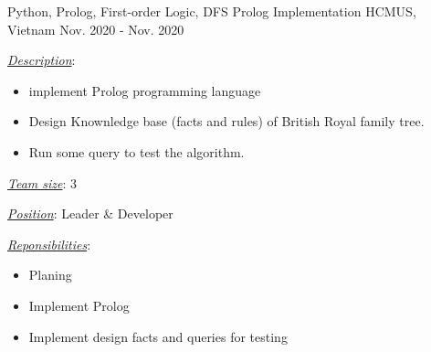 \begin{cventries}
  \cventry
    {Python, Prolog, First-order Logic, DFS} %
    {Prolog Implementation} %
    {HCMUS, Vietnam} %
    {Nov. 2020 - Nov. 2020} %
    {
      \begin{cvitems} %
        \item \underline{\textit{Description}}:
        \begin{itemize}
          \item implement Prolog programming language
          \item Design Knownledge base (facts and rules) of British Royal family tree.
          \item Run some query to test the algorithm. 
        \end{itemize}
        \item \underline{\textit{Team size}}: 3
        \item \underline{\textit{Position}}: Leader \& Developer
        \item \underline{\textit{Reponsibilities}}: 
        \begin{itemize}
          \item Planing
          \item Implement Prolog 
          \item Implement design facts and queries for testing
        \end{itemize}
      \end{cvitems}
    }


\end{cventries}
